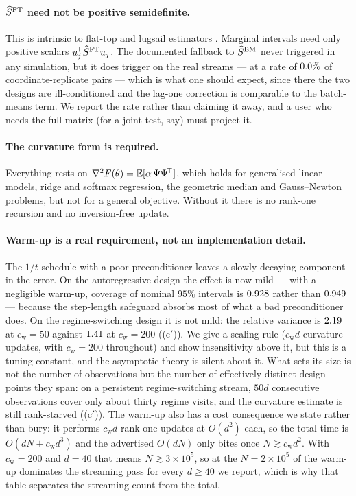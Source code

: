 \paragraph{$\widehat{S}^{\mathrm{FT}}$ need not be positive semidefinite.}
This is intrinsic to flat-top and lugsail estimators \citep[Remark~5]{singh2025utility}.
Marginal intervals need only positive scalars $u_j^{\!\top}\widehat{S}^{\mathrm{FT}} u_j$. The documented fallback to
$\widehat{S}^{\mathrm{BM}}$ never triggered in any simulation, but it does trigger on the real streams --- at a rate
of $0.0\%$ of coordinate-replicate pairs --- which is what one should expect, since
there the two designs are ill-conditioned and the lag-one correction is comparable to the
batch-means term. We report the rate rather than claiming it away, and a user who needs the full
matrix (for a joint test, say) must project it.

\paragraph{The curvature form is required.}
Everything rests on
$\nabla^2F(\theta)=\mathbb{E}[\alpha\,\Psi\Psi^{\!\top}]$, which holds for generalised linear
models, ridge and softmax regression, the geometric median and Gauss--Newton problems, but
not for a general objective. Without it there is no rank-one recursion and no
inversion-free update.

\paragraph{Warm-up is a real requirement, not an implementation detail.}
The $1/t$ schedule with a poor preconditioner leaves a slowly decaying component in the error.
On the autoregressive design the effect is now mild --- with a negligible warm-up, coverage of
nominal $95\%$ intervals is $0.928$ rather than $0.949$ --- because the
step-length safeguard absorbs most of what a bad preconditioner does. On the regime-switching
design it is not mild: the relative variance is $2.19$ at $c_{\mathrm w}=50$ against
$1.41$ at $c_{\mathrm w}=200$ ((c$'$)). We give a scaling rule
($c_{\mathrm w}d$ curvature updates, with $c_{\mathrm w}=200$ throughout) and show
insensitivity above it, but this is a tuning constant, and the asymptotic theory is silent
about it. What sets its size is not the number of observations but the number of effectively
distinct design points they span: on a persistent regime-switching stream, $50d$ consecutive
observations cover only about thirty regime visits, and the curvature estimate is still
rank-starved ((c$'$)). The warm-up also has a cost consequence we state
rather than bury: it performs $c_{\mathrm w}d$ rank-one updates at $O(d^2)$ each, so the total
time is $O(dN+c_{\mathrm w}d^3)$ and the advertised $O(dN)$ only bites once
$N\gtrsim c_{\mathrm w}d^2$. With $c_{\mathrm w}=200$ and $d=40$ that means
$N\gtrsim3\times10^5$, so at the $N=2\times10^5$ of  the warm-up dominates the
streaming pass for every $d\ge40$ we report, which is why that table separates the streaming
count from the total.

